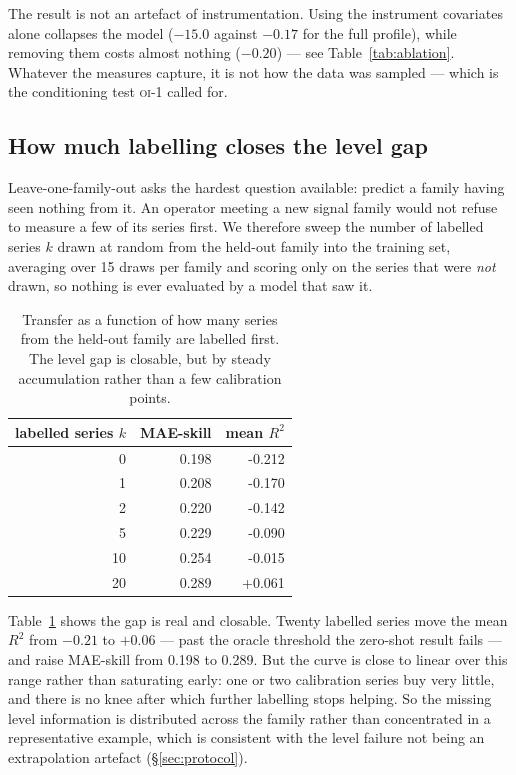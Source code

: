\documentclass[11pt,a4paper]{article}
\newcommand{\num}[1]{#1}
\newcommand{\oi}[1]{\textsc{oi-#1}}
\begin{document}
The result is not an artefact of instrumentation. Using the instrument covariates
alone collapses the model (\(-15.0\) against \(-0.17\) for the full profile),
while removing them costs almost nothing (\(-0.20\)) --- see
Table~\ref{tab:ablation}. Whatever the
measures capture, it is not how the data was sampled --- which is the
conditioning test \oi{1} called for.

\subsection{How much labelling closes the level gap}
\label{sec:fewshot}

Leave-one-family-out asks the hardest question available: predict a family
having seen nothing from it. An operator meeting a new signal family would not
refuse to measure a few of its series first. We therefore sweep the number of
labelled series \(k\) drawn at random from the held-out family into the training
set, averaging over \num{15} draws per family and scoring only on the series
that were \emph{not} drawn, so nothing is ever evaluated by a model that saw it.

\begin{table}[t]
\centering
\caption{Transfer as a function of how many series from the held-out family are
labelled first. The level gap is closable, but by steady accumulation rather
than a few calibration points.}
\label{tab:fewshot}
\small
\begin{tabular}{rrr}
\toprule
labelled series \(k\) & MAE-skill & mean \(R^2\) \\
\midrule
0  & \num{0.198} & \num{-0.212} \\
1  & \num{0.208} & \num{-0.170} \\
2  & \num{0.220} & \num{-0.142} \\
5  & \num{0.229} & \num{-0.090} \\
10 & \num{0.254} & \num{-0.015} \\
20 & \num{0.289} & \num{+0.061} \\
\bottomrule
\end{tabular}
\end{table}

Table~\ref{tab:fewshot} shows the gap is real and closable. Twenty labelled
series move the mean \(R^2\) from \(-0.21\) to \(+0.06\) --- past the oracle
threshold the zero-shot result fails --- and raise MAE-skill from \num{0.198} to
\num{0.289}. But the curve is close to linear over this range rather than
saturating early: one or two calibration series buy very little, and there is no
knee after which further labelling stops helping. So the missing level
information is distributed across the family rather than concentrated in a
representative example, which is consistent with the level failure not being an
extrapolation artefact (\S\ref{sec:protocol}).
\end{document}
